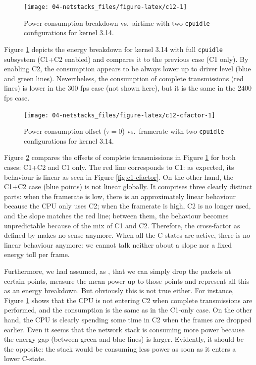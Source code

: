 \documentclass[twoside,nohyper]{tufte-book}
\theoremstyle{definition}
\theoremstyle{definition}
\theoremstyle{definition}
\theoremstyle{remark}
\begin{document}
\begin{figure}

{\centering \texttt{[image: 04-netstacks\_files/figure-latex/c12-1]} 

}

\caption[Power consumption breakdown vs.~airtime with two
\texttt{cpuidle} configurations for kernel 3.14.]{Power consumption breakdown vs.~airtime with two
\texttt{cpuidle} configurations for kernel 3.14.}\label{fig:c12}
\end{figure}

Figure \ref{fig:c12} depicts the energy breakdown for kernel 3.14 with
full \texttt{cpuidle} subsystem (C1+C2 enabled) and compares it to the
previous case (C1 only). By enabling C2, the consumption appears to be
always lower up to driver level (blue and green lines). Nevertheless,
the consumption of complete transmissions (red lines) is lower in the
300 fps case (not shown here), but it is the same in the 2400 fps case.




\begin{figure}

{\centering \texttt{[image: 04-netstacks\_files/figure-latex/c12-cfactor-1]} 

}

\caption[Power consumption offset (\(\tau=0\)) vs.~framerate
with two \texttt{cpuidle} configurations for kernel 3.14.]{Power consumption offset (\(\tau=0\)) vs.~framerate
with two \texttt{cpuidle} configurations for kernel 3.14.}\label{fig:c12-cfactor}
\end{figure}

Figure \ref{fig:c12-cfactor} compares the offsets of complete
transmissions in Figure \ref{fig:c12} for both cases: C1+C2 and C1 only.
The red line corresponds to C1: as expected, its behaviour is linear as
seen in Figure \ref{fig:c1-cfactor}. On the other hand, the C1+C2 case
(blue points) is not linear globally. It comprises three clearly
distinct parts: when the framerate is low, there is an approximately
linear behaviour because the CPU only uses C2; when the framerate is
high, C2 is no longer used, and the slope matches the red line; between
them, the behaviour becomes unpredictable because of the mix of C1 and
C2. Therefore, the cross-factor as defined by \citet{Serrano2014} makes
no sense anymore. When all the C-states are active, there is no linear
behaviour anymore: we cannot talk neither about a slope nor a fixed
energy toll per frame.

Furthermore, we had assumed, as \citet{Serrano2014}, that we can simply
drop the packets at certain points, measure the mean power up to those
points and represent all this as an energy breakdown. But obviously this
is not true either. For instance, Figure \ref{fig:c12} shows that the
CPU is not entering C2 when complete transmissions are performed, and
the consumption is the same as in the C1-only case. On the other hand,
the CPU is clearly spending some time in C2 when the frames are dropped
earlier. Even it seems that the network stack is consuming more power
because the energy gap (between green and blue lines) is larger.
Evidently, it should be the opposite: the stack would be consuming less
power as soon as it enters a lower C-state.
\end{document}

